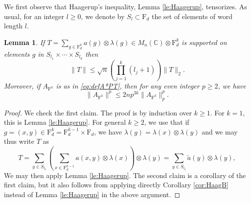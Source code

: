 \documentclass[11pt]{article}
\renewcommand{\star}{{\mathrm{F}}}
\newtheorem{lemma}{Lemma}[section]
\newcommand{\dF}{\mathrm{F}}
\newcommand{\dC}{\mathbb {C}}
\newcommand{\PAR}[1]{{{\left(#1\right)}}} %
\newcommand{\1}{1\!\!{\sf I}}
\begin{document}
We first observe that Haagerup's inequality, Lemma \ref{le:Haagerup}, tensorizes. As usual, for an integer $l\geq 0$, we denote by $S_l \subset \dF_d$ the set of elements of word length $l$. 

\begin{lemma}\label{le:HaagerupFdk}
If $T = \sum_{g \in \dF_d^k} a(g) \otimes \lambda(g) \in M_n(\dC) \otimes \dF_d^k$ is supported on elements $g$ in $S_{l_1} \times \cdots \times S_{l_k}$ then  
$$
\| T \| \leq \sqrt n \PAR{\prod_{j=1}^k (l_j+1) } \| T\|_2.
$$
Moreover, if $A_{\star^k}$ is as in \eqref{eq:defA*PT}, then for any even integer $p \geq 2$, we have
$$
\| A_{\star^k} \|^p \leq 2 n p^{3k} \| A_{\star^k} \|^{p}_p.
$$ 
\end{lemma} 
\begin{proof} 
We check the first claim. The proof is by induction over $k\geq 1$. For $k = 1$, this is Lemma \ref{le:Haagerup}. For general $k\geq 2$, we use that if $g = (x,y) \in \dF_d^k = \dF_d^{k-1} \times \dF_{d}$, we have $\lambda (g) = \lambda(x) \otimes \lambda(y)$ and we may thus write $T$ as 
$$
T =  \sum_{y \in S_{l_k}}  \PAR{ \sum_{x \in \dF_d^{k-1}} a(x,y) \otimes \lambda(x) } \otimes \lambda (y) = \sum_{y \in S_{l_k}}  \tilde a(y) \otimes \lambda (y),
$$ 
We may then apply Lemma \ref{le:Haagerup}.
The second claim is a corollary of the first claim, but it also follows from applying directly Corollary \ref{cor:HaagB} instead of Lemma \ref{le:Haagerup} in the above argument.
\end{proof} 
\end{document}
